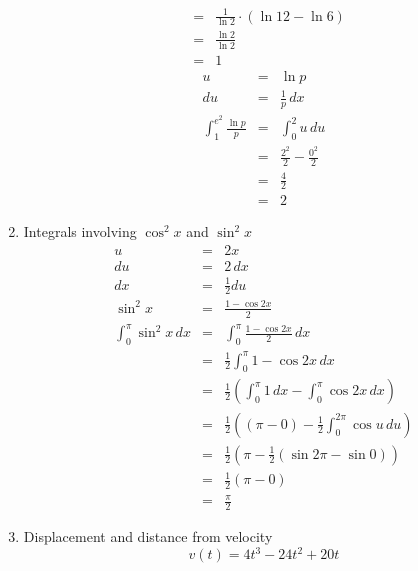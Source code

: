 \documentclass{article}
\begin{document}
\begin{enumerate}
\begin{eqnarray}
                                                      &=& \frac{1}{\ln{2}}\cdot\left(\ln{12} - \ln{6}\right) \\
                                                      &=& \frac{\ln{2}}{\ln{2}} \\
                                                      &=& 1
        \end{eqnarray}
        \begin{eqnarray}
            u &=& \ln{p} \\
            du &=& \frac{1}{p}\,dx \\
            \int_1^{e^2}{\frac{\ln{p}}{p}} &=& \int_0^2{u\,du} \\
                                           &=& \frac{2^2}{2} - \frac{0^2}{2} \\
                                           &=& \frac{4}{2} \\
                                           &=& 2
        \end{eqnarray}
    \item Integrals involving $\cos^2{x}$ and $\sin^2{x}$
        \begin{eqnarray}
            u &=& 2x \\
            du &=& 2\,dx \\
            dx &=& \frac{1}{2}du \\
            \sin^2{x} &=& \frac{1 - \cos{2x}}{2} \\
            \int_0^{\pi}{\sin^2{x}\,dx} &=& \int_0^{\pi}{\frac{1 - \cos{2x}}{2}\,dx} \\
                                        &=& \frac{1}{2}\int_0^{\pi}{1 - \cos{2x}\,dx} \\
                                        &=& \frac{1}{2}\left(\int_0^{\pi}{1\,dx} - \int_0^{\pi}{\cos{2x}\,dx}\right) \\
                                        &=& \frac{1}{2}\left(\left(\pi - 0\right) - \frac{1}{2}\int_0^{2\pi}{\cos{u}\,du}\right) \\
                                        &=& \frac{1}{2}\left(\pi - \frac{1}{2}\left(\sin{2\pi} - \sin{0}\right)\right) \\
                                        &=& \frac{1}{2}\left(\pi - 0\right) \\
                                        &=& \frac{\pi}{2}
        \end{eqnarray}
    \item Displacement and distance from velocity
        $$v(t) = 4t^3 - 24t^2 + 20t$$

\end{enumerate}
\end{document}
